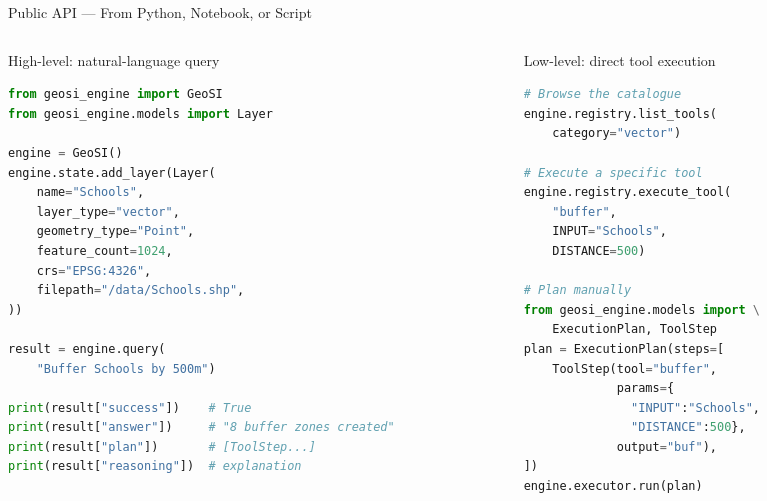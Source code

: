 \documentclass[aspectratio=169,11pt]{beamer}
\begin{document}
\begin{frame}{Public API --- From Python, Notebook, or Script}
  \small
  \begin{columns}[T,onlytextwidth]
    \begin{column}{0.5\textwidth}
      \begin{block}{High-level: natural-language query}
\begin{lstlisting}[language=Python]
from geosi_engine import GeoSI
from geosi_engine.models import Layer

engine = GeoSI()
engine.state.add_layer(Layer(
    name="Schools",
    layer_type="vector",
    geometry_type="Point",
    feature_count=1024,
    crs="EPSG:4326",
    filepath="/data/Schools.shp",
))

result = engine.query(
    "Buffer Schools by 500m")

print(result["success"])    # True
print(result["answer"])     # "8 buffer zones created"
print(result["plan"])       # [ToolStep...]
print(result["reasoning"])  # explanation
\end{lstlisting}
      \end{block}
    \end{column}
    \begin{column}{0.5\textwidth}
      \begin{block}{Low-level: direct tool execution}
\begin{lstlisting}[language=Python]
# Browse the catalogue
engine.registry.list_tools(
    category="vector")

# Execute a specific tool
engine.registry.execute_tool(
    "buffer",
    INPUT="Schools",
    DISTANCE=500)

# Plan manually
from geosi_engine.models import \
    ExecutionPlan, ToolStep
plan = ExecutionPlan(steps=[
    ToolStep(tool="buffer",
             params={
               "INPUT":"Schools",
               "DISTANCE":500},
             output="buf"),
])
engine.executor.run(plan)
\end{lstlisting}
      \end{block}
    \end{column}
  \end{columns}
\end{frame}
\end{document}
